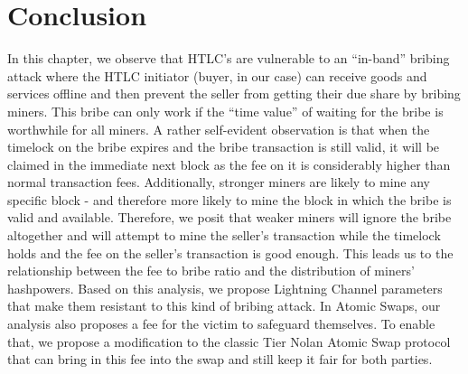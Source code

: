\section{Conclusion}
In this chapter, we observe that HTLC's are vulnerable to an ``in-band'' bribing attack where the HTLC initiator (buyer, in our case) can receive goods and services offline and then prevent the seller from getting their due share by bribing miners. This bribe can only work if the ``time value'' of waiting for the bribe is worthwhile for all miners. A rather self-evident observation is that when the timelock on the bribe expires and the bribe transaction is still valid, it will be claimed in the immediate next block as the fee on it is considerably higher than normal transaction fees. Additionally, stronger miners are likely to mine any specific block - and therefore more likely to mine the block in which the bribe is valid and available. Therefore, we posit that weaker miners will ignore the bribe altogether and will attempt to mine the seller's transaction while the timelock holds and the fee on the seller's transaction is good enough. This leads us to the relationship between the fee to bribe ratio and the distribution of miners' hashpowers. Based on this analysis, we propose Lightning Channel parameters that make them resistant to this kind of bribing attack. In Atomic Swaps, our analysis also proposes a fee for the victim to safeguard themselves. To enable that, we propose a modification to the classic Tier Nolan Atomic Swap protocol that can bring in this fee into the swap and still keep it fair for both parties.